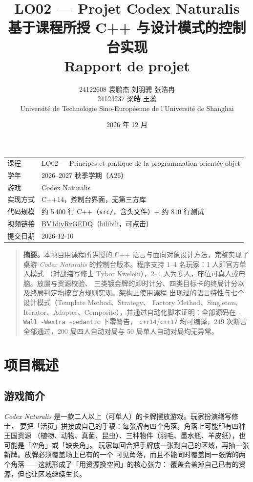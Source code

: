 \documentclass[11pt,a4paper]{ctexart}
\title{\textbf{LO02 --- Projet Codex Naturalis}\\[4pt]
\large 基于课程所授 C++ 与设计模式的控制台实现\\[2pt]
\large Rapport de projet}
\author{24122608 袁鹏杰 \quad 24122603 刘羽骋 \quad 24123026 张浩冉\\[2pt]
24124237 梁皓 \quad 24123948 王蕊\\[6pt]
Université de Technologie Sino-Européenne de l'Université de Shanghai}
\date{2026 年 12 月}
\newcommand{\cl}[1]{\texttt{#1}}
\begin{document}
\maketitle
\thispagestyle{empty}

\vspace{6mm}
\begin{center}
\begin{tabular}{ll}
\toprule
课程 & LO02 --- Principes et pratique de la programmation orientée objet \\
学年 & 2026--2027 秋季学期（A26）\\
游戏 & Codex Naturalis \\
实现方式 & C++14，控制台界面，无第三方库 \\
代码规模 & 约 5\,400 行 C++（\cl{src/}，含头文件）+ 约 810 行测试 \\
视频链接 & \href{https://www.bilibili.com/video/BV1diyRzGEDQ}{BV1diyRzGEDQ}（bilibili，可点击） \\
提交日期 & 2026-12-10 \\
\bottomrule
\end{tabular}
\end{center}

\vspace{8mm}
\begin{quote}
\textbf{摘要。}本项目用课程所讲授的 C++ 语言与面向对象设计方法，完整实现了桌游
\emph{Codex Naturalis} 的控制台版本。程序支持 1--4 名玩家：1 人即官方单人模式
（对战缮写修士 Tybor Kwelein），2--4 人为多人，座位可真人或电脑。放置与资源校验、
三类镀金牌的即时计分、四类目标卡的终局计分以及终局判定均按官方规则实现。架构上使用课程
出现过的语言特性与七个设计模式（Template Method、Strategy、
Factory Method、Singleton、Iterator、Adapter、Composite），并通过自动化脚本证明：全部源码在 \cl{-Wall -Wextra -pedantic} 下零警告，
\cl{c++14}/\cl{c++17} 均可编译，249 次断言全部通过，200 局四人自动对局与 50 局单人自动对局均无异常。
\end{quote}

\newpage
\tableofcontents
\newpage

\section{项目概述}

\subsection{游戏简介}
\emph{Codex Naturalis} 是一款二人以上（可单人）的卡牌摆放游戏。玩家扮演缮写修士，
要把「活页」拼接成自己的手稿：每张牌有四个角落，角落上可能印有四种王国资源
（植物、动物、真菌、昆虫）、三种物件（羽毛、墨水瓶、羊皮纸），也可能是「空角」或「缺失角」。
玩家每回合把手牌放一张到自己的区域，再抽一张新牌。放牌必须覆盖场上已有的一个
可见角落，而且不能同时覆盖同一张牌的两个角落——这就形成了「用资源换空间」的核心张力：
覆盖会盖掉自己已有的资源，但也让区域继续生长。
\end{document}
